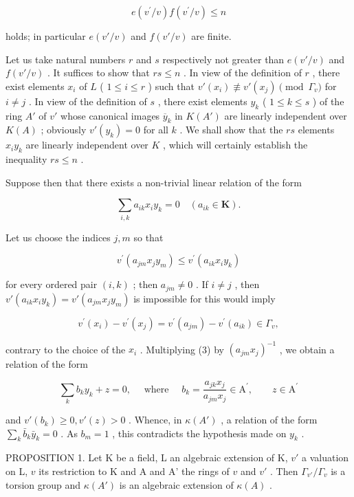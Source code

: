 \[
e (v ^ {\prime} / v) f (v ^ {\prime} / v) \leqslant n\tag{2}
\]

holds; in particular \(e(v' / v)\) and \(f(v' / v)\) are finite.

Let us take natural numbers \(r\) and \(s\) respectively not greater than \(e(v'/v)\) and \(f(v'/v)\) . It suffices to show that \(rs \leqslant n\) . In view of the definition of \(r\) , there exist elements \(x_i\) of \(L\) ( \(1 \leqslant i \leqslant r\) ) such that \(v'(x_i) \not\equiv v'(x_j) \pmod{\Gamma_v}\) for \(i \neq j\) . In view of the definition of \(s\) , there exist elements \(y_k\) ( \(1 \leqslant k \leqslant s\) ) of the ring \(A'\) of \(v'\) whose canonical images \(\overline{y}_k\) in \(K(A')\) are linearly independent over \(K(A)\) ; obviously \(v'(y_k) = 0\) for all \(k\) . We shall show that the \(rs\) elements \(x_i y_k\) are linearly independent over \(K\) , which will certainly establish the inequality \(rs \leqslant n\) .

Suppose then that there exists a non-trivial linear relation of the form

\[
\sum_ {i, k} a _ {i k} x _ {i} y _ {k} = 0 \quad (a _ {i k} \in \mathbf {K}).\tag{3}
\]

Let us choose the indices \(j, m\) so that

\[
v ^ {\prime} (a _ {j m} x _ {j} y _ {m}) \leqslant v ^ {\prime} (a _ {i k} x _ {i} y _ {k})
\]

for every ordered pair \((i,k)\) ; then \(a_{jm} \neq 0\) . If \(i \neq j\) , then \(v'(a_{ik}x_iy_k) = v'(a_{jm}x_jy_m)\) is impossible for this would imply

\[
v ^ {\prime} (x _ {i}) - v ^ {\prime} (x _ {j}) = v ^ {\prime} (a _ {j m}) - v ^ {\prime} (a _ {i k}) \in \Gamma_ {v},
\]

contrary to the choice of the \(x_{i}\) . Multiplying (3) by \((a_{jm}x_j)^{-1}\) , we obtain a relation of the form

\[
\sum_ {k} b _ {k} y _ {k} + z = 0, \quad \text { where } \quad b _ {k} = \frac {a _ {j k} x _ {j}}{a _ {j m} x _ {j}} \in \mathrm{A} ^ {\prime}, \qquad z \in \mathrm{A} ^ {\prime}
\]

and \(v'(b_k) \geqslant 0, v'(z) > 0\) . Whence, in \(\kappa(A')\) , a relation of the form \(\sum_{k} \bar{b}_k \bar{y}_k = 0\) . As \(b_m = 1\) , this contradicts the hypothesis made on \(y_k\) .

PROPOSITION 1. Let K be a field, L an algebraic extension of K, \(v'\) a valuation on L, \(v\) its restriction to K and A and A' the rings of \(v\) and \(v'\) . Then \(\Gamma_{v'} / \Gamma_v\) is a torsion group and \(\kappa(A')\) is an algebraic extension of \(\kappa(A)\) .

